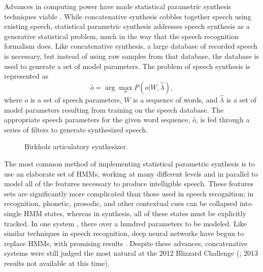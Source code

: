 \documentclass{article}
\begin{document}
Advances in computing power
have made statistical parametric synthesis
techniques viable \citep{zen2009}.
While concatenative synthesis
cobbles together speech using existing speech,
statistical parametric synthesis
addresses speech synthesis
as a generative statistical problem,
much in the way that
the speech recognition formalism does.
Like concatenative synthesis,
a large database of recorded speech is necessary,
but instead of using
raw samples from that database,
the database is used to generate
a set of model parameters.
The problem of speech synthesis
is represented as
\begin{equation}
  \hat{o} = \arg \max_o P(o|W, \hat{\lambda}),
\end{equation}
where $o$ is a set of speech parameters,
$W$ is a sequence of words,
and $\hat{\lambda}$ is a set of model parameters
resulting from training on the speech database.
The appropriate speech parameters
for the given word sequence, $\hat{o}$,
is fed through a series of filters
to generate synthesized speech.

\begin{wrapfigure}{l}{0.421\textwidth}
  \vspace{-30pt}
  \begin{center}
  \end{center}
  \vspace{-12pt}
  \caption{Birkholz articulatory synthesizer.}
  \label{fig:birkholz}
  \vspace{-20pt}
\end{wrapfigure}

The most common method of implementing
statistical parametric synthesis
is to use an elaborate set of HMMs,
working at many different levels
and in parallel to model
all of the features necessary to produce
intelligible speech.
These features sets are significantly
more complicated than those
used in speech recognition;
in recognition, phonetic, prosodic,
and other contextual cues
can be collapsed into single HMM states,
whereas in synthesis,
all of these states must be explicitly tracked.
In one system \citep{zen2007},
there over a hundred parameters to be modeled.
Like similar techniques in speech recognition,
deep neural networks have begun
to replace HMMs, with promising results
\citep{zen2013}.
Despite these advances, concatenative systems
were still judged the most natural
at the 2012 Blizzard Challenge
(\citealp{kinga2012};
2013 results not available at this time).
\end{document}
